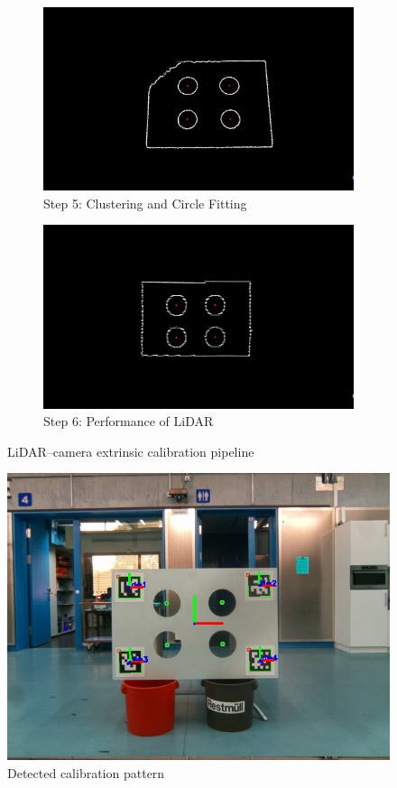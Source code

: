 \documentclass[english, bachelor, utf8]{base/thesis_telematics}
\begin{document}
\begin{figure}[htbp]
    \begin{subfigure}[b]{0.45\textwidth}
        \centering
        \includegraphics[width=\linewidth]{pics/calib_pics/cluster.png}
        \caption{Step 5: Clustering and Circle Fitting}
    \end{subfigure}
    \hfill
    \begin{subfigure}[b]{0.45\textwidth}
        \centering
        \includegraphics[width=\linewidth]{pics/calib_pics/ouster_cluster.png}
        \caption{Step 6: Performance of LiDAR}
    \end{subfigure}

    \caption{LiDAR--camera extrinsic calibration pipeline\cite{FASTCalibROS2}}
    \label{fig:steps}
\end{figure}

\begin{figure}[ht!]
    \centering
    \includegraphics[width=0.7\linewidth]{pics/qr_detect_robo.png}
    \caption{Detected calibration pattern}
    \label{fig:detect_extrinsic_calib}
\end{figure}
\end{document}
